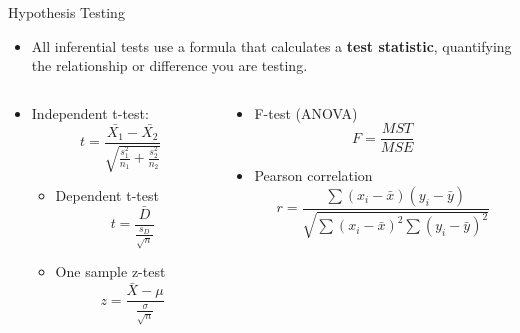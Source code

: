 \documentclass[
  ignorenonframetext,
]{beamer}
\providecommand{\tightlist}{%
  \setlength{\itemsep}{0pt}\setlength{\parskip}{0pt}}
\begin{document}
\begin{frame}{Hypothesis Testing}
\label{hypothesis-testing}
\begin{itemize}
\tightlist
\item
  All inferential tests use a formula that calculates a \textbf{test
  statistic}, quantifying the relationship or difference you are
  testing.
\end{itemize}

\begin{columns}[T]
\begin{column}{0.48\textwidth}
\small

\begin{itemize}
\item
  Independent t-test:
  \[t = \frac{\bar{X_1} - \bar{X_2}}{\sqrt{\frac{s_1^2}{n_1} + \frac{s_2^2}{n_2}}}\]

  \begin{itemize}
  \item
    Dependent t-test \[t = \frac{\bar{D}}{\frac{s_D}{\sqrt{n}}}\]
  \item
    One sample z-test
    \[z = \frac{\bar{X} - \mu}{\frac{\sigma}{\sqrt{n}}}\] \small  
  \end{itemize}
\end{itemize}
\end{column}

\begin{column}{0.48\textwidth}
\small

\begin{itemize}
\item
  F-test (ANOVA) \[F = \frac{MST}{MSE}\]
\item
  Pearson correlation
  \[r = \frac{\sum (x_i - \bar{x})(y_i - \bar{y})}{\sqrt{\sum (x_i - \bar{x})^2 \sum (y_i - \bar{y})^2}}\]\\
\end{itemize}
\end{column}
\end{columns}
\end{frame}
\end{document}
